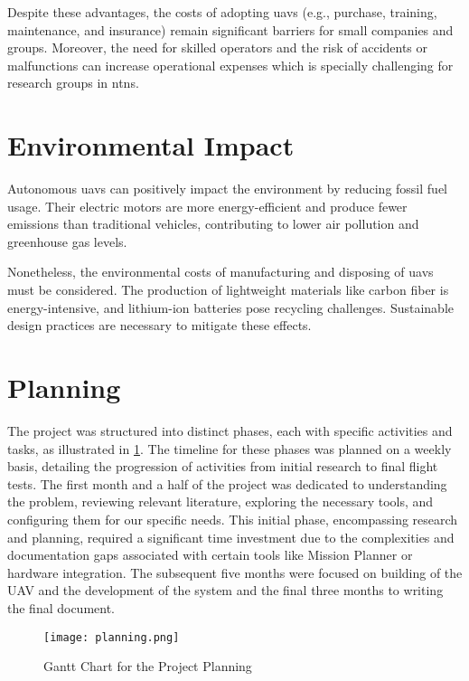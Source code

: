 Despite these advantages, the costs of adopting \glspl{uav} (e.g., purchase, training, maintenance, and insurance) remain significant barriers for small companies and groups. Moreover, the need for skilled operators and the risk of accidents or malfunctions can increase operational expenses which is specially challenging for research groups in \glspl{ntn}.

\section{Environmental Impact}\label{sec:environmental_impact}

Autonomous \glspl{uav} can positively impact the environment by reducing fossil fuel usage. Their electric motors are more energy-efficient and produce fewer emissions than traditional vehicles, contributing to lower air pollution and greenhouse gas levels.

Nonetheless, the environmental costs of manufacturing and disposing of \glspl{uav} must be considered. The production of lightweight materials like carbon fiber is energy-intensive, and lithium-ion batteries pose recycling challenges. Sustainable design practices are necessary to mitigate these effects.

\section{Planning}

The project was structured into distinct phases, each with specific activities and tasks, as illustrated in \cref{fig:planning}. The timeline for these phases was planned on a weekly basis, detailing the progression of activities from initial research to final flight tests. The first month and a half of the project was dedicated to understanding the problem, reviewing relevant literature, exploring the necessary tools, and configuring them for our specific needs. This initial phase, encompassing research and planning, required a significant time investment due to the complexities and documentation gaps associated with certain tools like Mission Planner or hardware integration. The subsequent five months were focused on building of the UAV and the development of the system and the final three months to writing the final document.

\begin{figure}
    \texttt{[image: planning.png]}
    \caption{Gantt Chart for the Project Planning}\label{fig:planning}
\end{figure}

